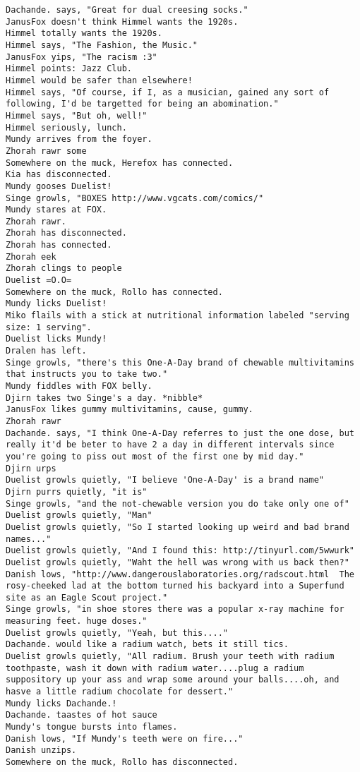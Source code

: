 \begin{verbatim}
Dachande. says, "Great for dual creesing socks."
JanusFox doesn't think Himmel wants the 1920s.
Himmel totally wants the 1920s.
Himmel says, "The Fashion, the Music."
JanusFox yips, "The racism :3"
Himmel points: Jazz Club.
Himmel would be safer than elsewhere!
Himmel says, "Of course, if I, as a musician, gained any sort of following, I'd be targetted for being an abomination."
Himmel says, "But oh, well!"
Himmel seriously, lunch.
Mundy arrives from the foyer.
Zhorah rawr some
Somewhere on the muck, Herefox has connected.
Kia has disconnected.
Mundy gooses Duelist!
Singe growls, "BOXES http://www.vgcats.com/comics/"
Mundy stares at FOX.
Zhorah rawr.
Zhorah has disconnected.
Zhorah has connected.
Zhorah eek
Zhorah clings to people
Duelist =O.O=
Somewhere on the muck, Rollo has connected.
Mundy licks Duelist!
Miko flails with a stick at nutritional information labeled "serving size: 1 serving".
Duelist licks Mundy!
Dralen has left.
Singe growls, "there's this One-A-Day brand of chewable multivitamins that instructs you to take two."
Mundy fiddles with FOX belly.
Djirn takes two Singe's a day. *nibble*
JanusFox likes gummy multivitamins, cause, gummy.
Zhorah rawr
Dachande. says, "I think One-A-Day referres to just the one dose, but really it'd be beter to have 2 a day in different intervals since you're going to piss out most of the first one by mid day."
Djirn urps
Duelist growls quietly, "I believe 'One-A-Day' is a brand name"
Djirn purrs quietly, "it is"
Singe growls, "and the not-chewable version you do take only one of"
Duelist growls quietly, "Man"
Duelist growls quietly, "So I started looking up weird and bad brand names..."
Duelist growls quietly, "And I found this: http://tinyurl.com/5wwurk"
Duelist growls quietly, "Waht the hell was wrong with us back then?"
Danish lows, "http://www.dangerouslaboratories.org/radscout.html  The rosy-cheeked lad at the bottom turned his backyard into a Superfund site as an Eagle Scout project."
Singe growls, "in shoe stores there was a popular x-ray machine for measuring feet. huge doses."
Duelist growls quietly, "Yeah, but this...."
Dachande. would like a radium watch, bets it still tics.
Duelist growls quietly, "All radium. Brush your teeth with radium toothpaste, wash it down with radium water....plug a radium suppository up your ass and wrap some around your balls....oh, and hasve a little radium chocolate for dessert."
Mundy licks Dachande.!
Dachande. taastes of hot sauce
Mundy's tongue bursts into flames.
Danish lows, "If Mundy's teeth were on fire..."
Danish unzips.
Somewhere on the muck, Rollo has disconnected.

\end{verbatim}
